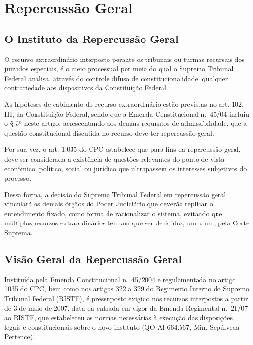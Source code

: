 \documentclass[
]{book}
\begin{document}
\hypertarget{repercussuxe3o-geral}{%
\chapter{Repercussão Geral}\label{repercussuxe3o-geral}}

\hypertarget{o-instituto-da-repercussuxe3o-geral}{%
\section{O Instituto da Repercussão Geral}\label{o-instituto-da-repercussuxe3o-geral}}

O recurso extraordinário interposto perante os tribunais ou turmas recursais dos juizados especiais, é o meio processual por meio do qual o Supremo Tribunal Federal analisa, através do controle difuso de constitucionalidade, qualquer contrariedade aos dispositivos da Constituição Federal.

As hipóteses de cabimento do recurso extraordinário estão previstas no art. 102, III, da Constituição Federal, sendo que a Emenda Constitucional n.~45/04 incluiu o § 3º neste artigo, acrescentando aos demais requisitos de admissibilidade, que a questão constitucional discutida no recurso deve ter repercussão geral.

Por sua vez, o art. 1.035 do CPC estabelece que para fins da repercussão geral, deve ser considerada a existência de questões relevantes do ponto de vista econômico, político, social ou jurídico que ultrapassem os interesses subjetivos do processo.

Dessa forma, a decisão do Supremo Tribunal Federal em repercussão geral vinculará os demais órgãos do Poder Judiciário que deverão replicar o entendimento fixado, como forma de racionalizar o sistema, evitando que múltiplos recursos extraordinários tenham que ser decididos, um a um, pela Corte Suprema.

\hypertarget{visuxe3o-geral-da-repercussuxe3o-geral}{%
\section{Visão Geral da Repercussão Geral}\label{visuxe3o-geral-da-repercussuxe3o-geral}}

Instituída pela Emenda Constitucional n.~45/2004 e regulamentada no artigo 1035 do CPC, bem como nos artigos 322 a 329 do Regimento Interno do Supremo Tribunal Federal (RISTF), é pressuposto exigido nos recursos interpostos a partir de 3 de maio de 2007, data da entrada em vigor da Emenda Regimental n.~21/07 ao RISTF, que estabeleceu as normas necessárias à execução das disposições legais e constitucionais sobre o novo instituto (QO-AI 664.567, Min. Sepúlveda Pertence).
\end{document}
